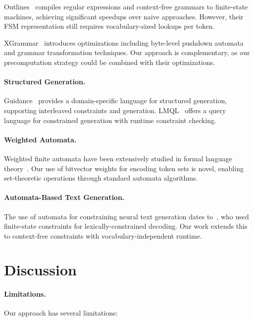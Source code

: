 \documentclass[11pt,a4paper]{article}
\theoremstyle{plain}
\theoremstyle{definition}
\theoremstyle{remark}
\begin{document}
Outlines~\citep{willard2023outlines} compiles regular expressions and context-free grammars to finite-state machines, achieving significant speedups over naive approaches. However, their FSM representation still requires vocabulary-sized lookups per token.

XGrammar~\citep{dong2024xgrammar} introduces optimizations including byte-level pushdown automata and grammar transformation techniques. Our approach is complementary, as our precomputation strategy could be combined with their optimizations.

\paragraph{Structured Generation.}
Guidance~\citep{guidance2023} provides a domain-specific language for structured generation, supporting interleaved constraints and generation. LMQL~\citep{beurer2023lmql} offers a query language for constrained generation with runtime constraint checking.

\paragraph{Weighted Automata.}
Weighted finite automata have been extensively studied in formal language theory~\citep{droste2009handbook}. Our use of bitvector weights for encoding token sets is novel, enabling set-theoretic operations through standard automata algorithms.

\paragraph{Automata-Based Text Generation.}
The use of automata for constraining neural text generation dates to~\citet{hokamp2017lexically}, who used finite-state constraints for lexically-constrained decoding. Our work extends this to context-free constraints with vocabulary-independent runtime.

\section{Discussion}
\label{sec:discussion}

\paragraph{Limitations.}
Our approach has several limitations:
\end{document}
